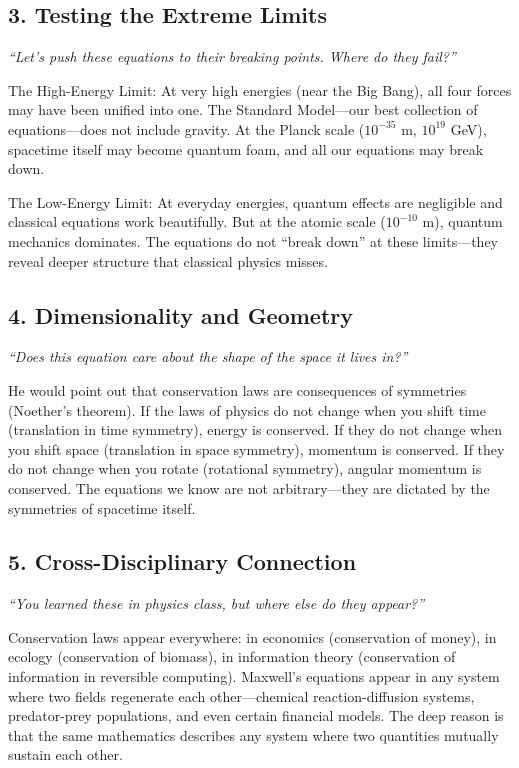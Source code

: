 \documentclass[11pt,openright]{book}
\begin{document}
\subsection*{3. Testing the Extreme Limits}
\textit{``Let's push these equations to their breaking points. Where do they fail?''}

The High-Energy Limit: At very high energies (near the Big Bang), all four forces may have been unified into one. The Standard Model---our best collection of equations---does not include gravity. At the Planck scale ($10^{-35}$ m, $10^{19}$ GeV), spacetime itself may become quantum foam, and all our equations may break down.

The Low-Energy Limit: At everyday energies, quantum effects are negligible and classical equations work beautifully. But at the atomic scale ($10^{-10}$ m), quantum mechanics dominates. The equations do not ``break down'' at these limits---they reveal deeper structure that classical physics misses.

\subsection*{4. Dimensionality and Geometry}
\textit{``Does this equation care about the shape of the space it lives in?''}

He would point out that conservation laws are consequences of symmetries (Noether's theorem). If the laws of physics do not change when you shift time (translation in time symmetry), energy is conserved. If they do not change when you shift space (translation in space symmetry), momentum is conserved. If they do not change when you rotate (rotational symmetry), angular momentum is conserved. The equations we know are not arbitrary---they are dictated by the symmetries of spacetime itself.

\subsection*{5. Cross-Disciplinary Connection}
\textit{``You learned these in physics class, but where else do they appear?''}

Conservation laws appear everywhere: in economics (conservation of money), in ecology (conservation of biomass), in information theory (conservation of information in reversible computing). Maxwell's equations appear in any system where two fields regenerate each other---chemical reaction-diffusion systems, predator-prey populations, and even certain financial models. The deep reason is that the same mathematics describes any system where two quantities mutually sustain each other.
\end{document}
